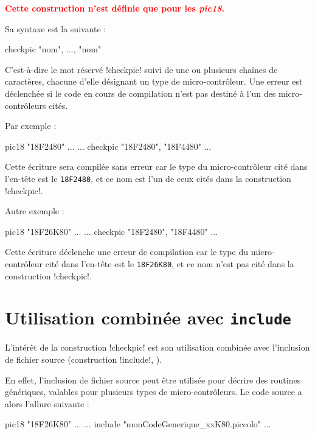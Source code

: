 


\thispagestyle{empty}

\textcolor{red}{\bf Cette construction n'est définie que pour les \emph{pic18}.}

Sa syntaxe est la suivante :

\begin{piccolo}
checkpic "nom", ..., "nom"
\end{piccolo}

C'est-à-dire le mot réservé \pic!checkpic! suivi de une ou plusieurs chaînes de caractères, chacune d'elle désignant un type de micro-contrôleur. Une erreur est déclenchée si le code en cours de compilation n'est pas destiné à l'un des micro-contrôleurs cités.

Par exemple :

\begin{piccolo}
pic18 "18F2480" ...
  ...
checkpic "18F2480", "18F4480"
  ...
\end{piccolo}

Cette écriture sera compilée sans erreur car le type du micro-contrôleur cité dans l'en-tête est le \texttt{18F2480}, et ce nom est l'un de ceux cités dans la construction \pic!checkpic!.

Autre exemple :

\begin{piccolo}
pic18 "18F26K80" ...
  ...
checkpic "18F2480", "18F4480"
  ...
\end{piccolo}

Cette écriture déclenche une erreur de compilation car le type du micro-contrôleur cité dans l'en-tête est le \texttt{18F26K80}, et ce nom n'est pas cité dans la construction \pic!checkpic!.




\section{Utilisation combinée avec \texttt{include}}
L'intérêt de la construction \pic!checkpic! est son utilisation combinée avec l'inclusion de fichier source (construction \pic!include!, ).

En effet, l'inclusion de fichier source peut être utilisée pour décrire des routines génériques, valables pour plusieurs types de micro-contrôleurs. Le code source a alors l'allure suivante :
\begin{piccolo}
pic18 "18F26K80" ...
  ...
include "monCodeGenerique_xxK80.piccolo"
  ...
\end{piccolo}

